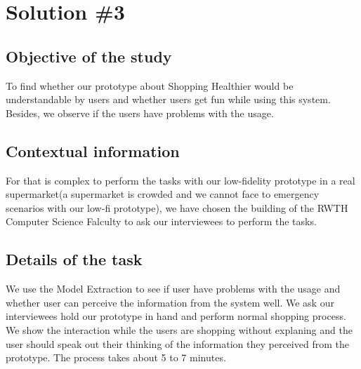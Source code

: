 \section{Solution \#3}

\subsection{Objective of the study}
To find whether our prototype about Shopping Healthier would be understandable by users and whether users get fun while using this system. Besides, we observe if the users have problems with the usage.

\subsection{Contextual information}
For that is complex to perform the tasks with our low-fidelity prototype in a real supermarket(a supermarket is crowded and we cannot face to emergency scenarios with our low-fi prototype), we have chosen the building of the RWTH Computer Science Falculty to ask our interviewees to perform the tasks.

\subsection{Details of the task}
We use the Model Extraction to see if user have problems with the usage and whether user can  perceive the information from the system well. We ask our interviewees hold our prototype in hand and perform normal shopping process. We show the interaction while the users are shopping without explaning and the user should speak out their thinking of the information they perceived from the prototype. The process takes about 5 to 7 minutes.

